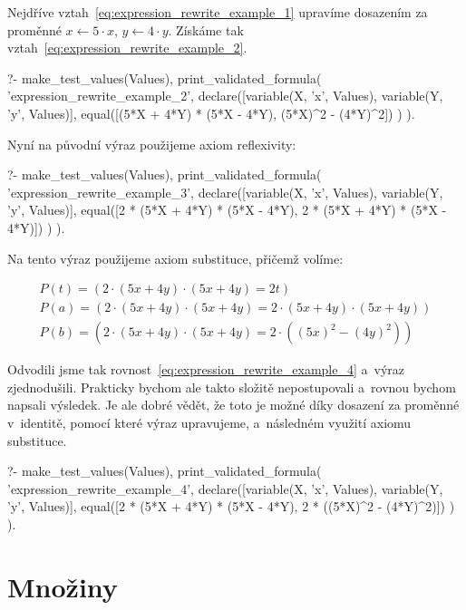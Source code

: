 Nejdříve vztah~\ref{eq:expression_rewrite_example_1} upravíme dosazením za proměnné \(x \leftarrow 5 \cdot x\), \(y \leftarrow 4 \cdot y\). Získáme tak vztah~\eqref{eq:expression_rewrite_example_2}.

\begin{prolog}
?- 	make_test_values(Values),
	print_validated_formula(
		'expression_rewrite_example_2',
		declare([variable(X, 'x', Values), variable(Y, 'y', Values)],
			equal([(5*X + 4*Y) * (5*X - 4*Y), (5*X)^2 - (4*Y)^2])
		)
	).
\end{prolog}

Nyní na původní výraz použijeme axiom reflexivity:

\begin{prolog}
?- 	make_test_values(Values),
	print_validated_formula(
		'expression_rewrite_example_3',
		declare([variable(X, 'x', Values), variable(Y, 'y', Values)],
			equal([2 * (5*X + 4*Y) * (5*X - 4*Y), 2 * (5*X + 4*Y) * (5*X - 4*Y)])
		)
	).
\end{prolog}

Na tento výraz použijeme axiom substituce, přičemž volíme:

\begin{equation}
\begin{split}
P(t) = (2 \cdot (5 x + 4 y) \cdot (5 x + 4 y) = 2 t) \\
P(a) = (2 \cdot (5 x + 4 y) \cdot (5 x + 4 y) = 2 \cdot (5 x + 4 y) \cdot (5 x + 4 y)) \\
P(b) = (2 \cdot (5 x + 4 y) \cdot (5 x + 4 y) = 2 \cdot ((5 x)^2 - (4 y)^2))
\end{split}
\end{equation}

Odvodili jsme tak rovnost~\eqref{eq:expression_rewrite_example_4} a~výraz zjednodušili. Prakticky bychom ale takto složitě nepostupovali a~rovnou bychom napsali výsledek. Je ale dobré vědět, že toto je možné díky dosazení za proměnné v~identitě, pomocí které výraz upravujeme, a~následném využití axiomu substituce.

\begin{prolog}
?- 	make_test_values(Values),
	print_validated_formula(
		'expression_rewrite_example_4',
		declare([variable(X, 'x', Values), variable(Y, 'y', Values)],
			equal([2 * (5*X + 4*Y) * (5*X - 4*Y), 2 * ((5*X)^2 - (4*Y)^2)])
		)
	).
\end{prolog}

\section{Množiny}

